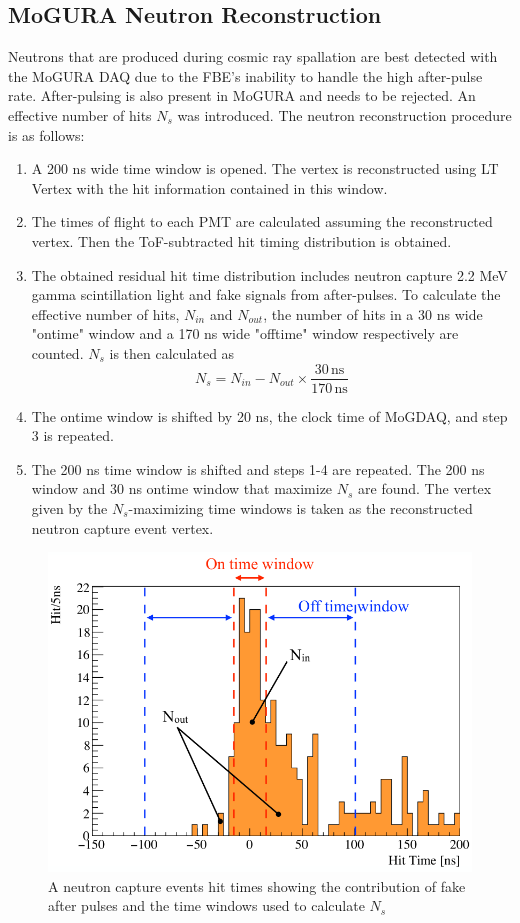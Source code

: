 \subsection{MoGURA Neutron Reconstruction}
Neutrons that are produced during cosmic ray spallation are best detected with the MoGURA DAQ due to the FBE's inability to handle the high after-pulse rate. After-pulsing is also present in MoGURA and needs to be rejected. An effective number of hits $N_s$ was introduced. The neutron reconstruction procedure is as follows:
\begin{enumerate}
	\item A 200 ns wide time window is opened. The vertex is reconstructed using LT Vertex with the hit information contained in this window.
	\item The times of flight to each PMT are calculated assuming the reconstructed vertex. Then the ToF-subtracted hit timing distribution is obtained.
	\item The obtained residual hit time distribution includes neutron capture 2.2 MeV gamma scintillation light and fake signals from after-pulses. To calculate the effective number of hits, $N_{in}$ and $N_{out}$, the number of hits in a 30 ns wide "ontime" window and a 170 ns wide "offtime" window respectively are counted. $N_s$ is then calculated as
	\begin{equation}
		N_s=N_{in}-N_{out}\times\frac{30\,\mathrm{ns}}{170\,\mathrm{ns}}
	\end{equation}
	\item The ontime window is shifted by 20 ns, the clock time of MoGDAQ, and step 3 is repeated.
	\item The 200 ns time window is shifted and steps 1-4 are repeated. The 200 ns window and 30 ns ontime window that maximize $N_s$ are found. The vertex given by the $N_s$-maximizing time windows is taken as the reconstructed neutron capture event vertex.
\end{enumerate}
\begin{figure}[htb]
	\centering
	\includegraphics[scale=0.4]{neutron_reco.png}
	\caption{A neutron capture events hit times showing the contribution of fake after pulses and the time windows used to calculate $N_s$}
	\label{fig:neutron_reco}
\end{figure}
